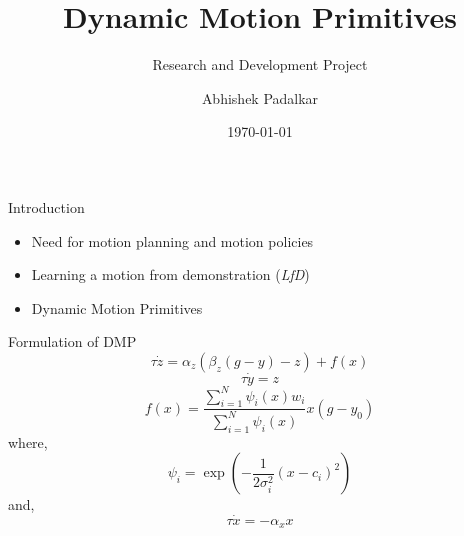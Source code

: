 \documentclass{beamer}
\author[]{Abhishek Padalkar}
\title{Dynamic Motion Primitives}
\subtitle{Research and Development Project}
\institute[HBRS]{Hochschule Bonn-Rhein-Sieg}
\date{\today}
\begin{document}
	{
	\begin{frame}
	\titlepage
	\end{frame}
	}
	
	\begin{frame}{Introduction}
		\begin{itemize}
			\item Need for motion planning and motion policies
			\item Learning a motion from demonstration (\textit{LfD})
			\item Dynamic Motion Primitives
		\end{itemize}
	\end{frame}
	
	
	\begin{frame}{Formulation of DMP}
		\begin{equation}\label{DMP_1}
		\tau\dot{z} = \alpha_{z}(\beta_{z}(g - y) - z) + f(x)
		\end{equation}
		\begin{equation}\label{DMP_2}
		\tau \dot{y} = z
		\end{equation}
		\begin{equation}\label{forcing_term}
		f(x) = \frac{\sum_{i=1}^{N}\psi_{i}(x)w_{i}}{\sum_{i=1}^{N}\psi_{i}(x)}x(g - y_{0})
		\end{equation}
		where,
		\begin{equation}\label{psi}
		\psi_{i} = \exp(-{\frac{1}{2\sigma_{i}^{2}}(x - c_{i})^{2}})
		\end{equation}
		and,
		\begin{equation}\label{canonical}
		\tau \dot{x} = -\alpha_{x}x
		\end{equation}
	\end{frame}
	
\end{document}

